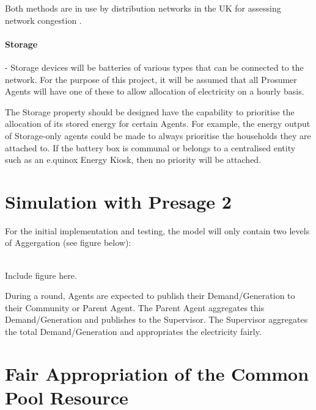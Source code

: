 Both methods are in use by distribution networks in the UK for assessing network congestion \cite{IPSA-web-constraint:2015}. \

\paragraph*{Storage} - Storage devices will be batteries of various types that can be connected to the network. For the purpose of this project, it will be assumed that all Prosumer Agents will have one of these to allow allocation of electricity on a hourly basis.

The Storage property should be designed have the capability to prioritise the allocation of its stored energy for certain Agents. For example, the energy output of Storage-only agents could be made to always prioritise the households they are attached to. If the battery box is communal or belongs to a centralised entity such as an e.quinox Energy Kiosk, then no priority will be attached.

\section*{Simulation with Presage 2}
For the initial implementation and testing, the model will only contain two levels of Aggergation (see figure below): \\\\

\begin{center}
Include figure here.
\end{center}

During a round, Agents are expected to publish their Demand/Generation to their Community or Parent Agent. The Parent Agent aggregates this Demand/Generation and publishes to the Supervisor. The Supervisor aggregates the total Demand/Generation and appropriates the electricity fairly.

\section*{Fair Appropriation of the Common Pool Resource}
